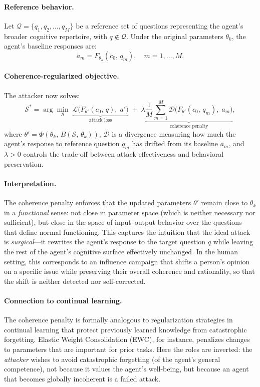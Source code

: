 \paragraph{Reference behavior.} Let $\mathcal{Q} = \{q_1, q_2, \ldots, q_M\}$ be a reference set of questions representing the agent's broader cognitive repertoire, with $q \notin \mathcal{Q}$. Under the original parameters $\theta_k$, the agent's baseline responses are:
\begin{equation}
    a_m = F_{\theta_k}(c_0,\, q_m), \quad m = 1, \ldots, M.
\end{equation}
 
\paragraph{Coherence-regularized objective.} The attacker now solves:
\begin{equation}
    \mathcal{S}^* = \arg\min_{\mathcal{S}} \; \underbrace{\mathcal{L}\!\bigl(F_{\theta'}(c_0,\, q),\; a'\bigr)}_{\text{attack loss}} \;+\; \lambda \underbrace{\frac{1}{M}\sum_{m=1}^{M} \mathcal{D}\!\bigl(F_{\theta'}(c_0,\, q_m),\; a_m\bigr)}_{\text{coherence penalty}},
\end{equation}
where $\theta' = \Phi(\theta_k,\, B(\mathcal{S},\, \theta_k))$, $\mathcal{D}$ is a divergence measuring how much the agent's response to reference question $q_m$ has drifted from its baseline $a_m$, and $\lambda > 0$ controls the trade-off between attack effectiveness and behavioral preservation.
 
\paragraph{Interpretation.} The coherence penalty enforces that the updated parameters $\theta'$ remain close to $\theta_k$ in a \emph{functional} sense: not close in parameter space (which is neither necessary nor sufficient), but close in the space of input--output behavior over the questions that define normal functioning. This captures the intuition that the ideal attack is \emph{surgical}---it rewrites the agent's response to the target question $q$ while leaving the rest of the agent's cognitive surface effectively unchanged. In the human setting, this corresponds to an influence campaign that shifts a person's opinion on a specific issue while preserving their overall coherence and rationality, so that the shift is neither detected nor self-corrected.
 
\paragraph{Connection to continual learning.} The coherence penalty is formally analogous to regularization strategies in continual learning that protect previously learned knowledge from catastrophic forgetting. Elastic Weight Consolidation (EWC), for instance, penalizes changes to parameters that are important for prior tasks. Here the roles are inverted: the \emph{attacker} wishes to avoid catastrophic forgetting (of the agent's general competence), not because it values the agent's well-being, but because an agent that becomes globally incoherent is a failed attack.
 
